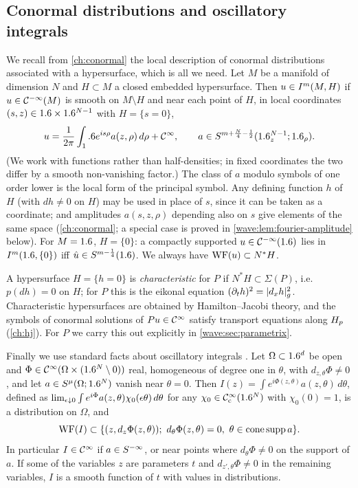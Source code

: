 \subsection{Conormal distributions and oscillatory integrals}

We recall from \cref{ch:conormal} the local description of conormal
distributions associated with a hypersurface, which is all we need. Let $M$ be
a manifold of dimension $N$ and $H\subset M$ a closed embedded hypersurface.
Then $u\in I^{m}(M,H)$ if $u\in\mathcal{C}^{-\infty}(M)$ is smooth on $M\setminus H$ and near
each point of $H$, in local coordinates $(s,z)\in1.6\times1.6^{N-1}$ with
$H=\{s=0\}$,
\begin{equation}\label{wave:eq:conormal-local}
u=\frac1{2\pi}\int_1.6 e^{is\rho}a(z,\rho)\,d\rho+\mathcal{C}^\infty,\qquad
a\in S^{m+\frac N4-\frac12}(1.6^{N-1}_z;1.6_\rho).
\end{equation}
(We work with functions rather than half-densities; in fixed coordinates the
two differ by a smooth non-vanishing factor.) The class of $a$ modulo symbols
of one order lower is the local form of the principal symbol. Any defining
function $h$ of $H$ (with $dh\ne0$ on $H$) may be used in place of $s$, since it
can be taken as a coordinate; and amplitudes $a(s,z,\rho)$ depending also on $s$
give elements of the same space (\cref{ch:conormal}; a special case is proved
in \cref{wave:lem:fourier-amplitude} below). For $M=1.6$, $H=\{0\}$: a compactly
supported $u\in\mathcal{C}^{-\infty}(1.6)$ lies in $I^{m}(1.6,\{0\})$ iff $\hat u\in S^{m-\frac14}(1.6)$.
We always have $\operatorname{WF}(u)\subset N^*H$.

A hypersurface $H=\{h=0\}$ is \emph{characteristic} for $P$ if
$N^*H\subset\Sigma(P)$, i.e.\ $p(dh)=0$ on $H$; for $P$ this is the eikonal
equation $(\partial_th)^2=|d_xh|_g^2$. Characteristic hypersurfaces are obtained by
Hamilton--Jacobi theory, and the symbols of conormal solutions of $Pu\in\mathcal{C}^\infty$
satisfy transport equations along $H_{p}$ (\cref{ch:hj}). For $P$ we carry
this out explicitly in \cref{wave:sec:parametrix}.

Finally we use standard facts about oscillatory integrals
\cite[Sections~8.1, 8.2]{Hormander-I}. Let $\Omega\subset1.6^d$ be open and
$\Phi\in\mathcal{C}^\infty(\Omega\times(1.6^N\setminus0))$ real, homogeneous of degree one in
$\theta$, with $d_{z,\theta}\Phi\ne0$, and let $a\in S^{\mu}(\Omega;1.6^N)$
vanish near $\theta=0$. Then
$I(z)=\int e^{i\Phi(z,\theta)}a(z,\theta)\,d\theta$, defined as
$\lim_{\epsilon\downarrow0}\int e^{i\Phi}a(z,\theta)\chi_0(\epsilon\theta)\,d\theta$ for any
$\chi_0\in\mathcal{C}^\infty_{\mathrm{c}}(1.6^N)$ with $\chi_0(0)=1$, is a distribution on $\Omega$, and
\begin{equation}\label{wave:eq:WF-osc}
\WF(I)\subset\{(z,d_z\Phi(z,\theta));\ d_\theta\Phi(z,\theta)=0,\ \theta\in\operatorname{cone\,supp}a\}.
\end{equation}
In particular $I\in\mathcal{C}^\infty$ if $a\in S^{-\infty}$, or near points where
$d_\theta\Phi\ne0$ on the support of $a$. If some of the variables $z$ are
parameters $t$ and $d_{z',\theta}\Phi\ne0$ in the remaining variables, $I$ is a
smooth function of $t$ with values in distributions.

